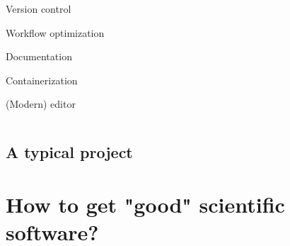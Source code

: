 \documentclass[usenames,dvipsnames]{beamer}
\theoremstyle{plain}
\theoremstyle{definition}
\begin{document}





\begin{frame}{\setframetitle{}}
  
  \begin{columns}[t]
    
    \begin{itemize}
      \item \textcolor{bg!85!normal text.fg}{Version control
      \item Workflow optimization    
      \item Documentation
      \item Containerization }
      \item (Modern) editor
    \end{itemize}
    
    \begin{figure}
      {}
    \end{figure}
  \end{columns}
  
\end{frame}


\subsection{A typical project}

\begin{frame}{\setframetitle{}}
  {
 \begin{figure}
         {}
 \end{figure}
 }
\end{frame}

\section{How to get "good" scientific software?}
\end{document}
